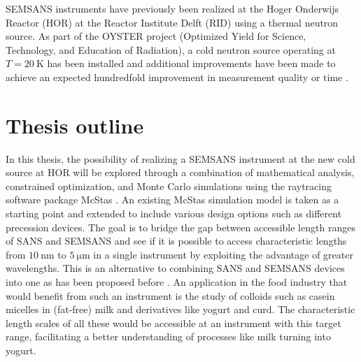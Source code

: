 SEMSANS instruments have previously been realized at the Hoger Onderwijs Reactor (HOR) at the Reactor Institute Delft (RID) using a thermal neutron source. As part of the OYSTER project (Optimized Yield for Science, Technology, and Education of Radiation), a cold neutron source operating at $T=\SI{20}{\kelvin}$ has been installed and additional improvements have been made to achieve an expected hundredfold improvement in measurement quality or time \cite{OYSTER2008}.

\section{Thesis outline}
\label{c1.3}
In this thesis, the possibility of realizing a SEMSANS instrument at the new cold source at HOR will be explored through a combination of mathematical analysis, constrained optimization, and Monte Carlo simulations using the raytracing software package McStas \cite{willendrup2020}. An existing McStas simulation model \cite{bouwman2021b} is taken as a starting point and extended to include various design options such as different precession devices. 
The goal is to bridge the gap between accessible length ranges of SANS and SEMSANS \cite{bouwman2021} and see if it is possible to access characteristic lengths from $\SI{10}{\nano\meter}$ to $\SI{5}{\micro\meter}$ in a single instrument by exploiting the advantage of greater wavelengths. This is an alternative to combining SANS and SEMSANS devices into one as has been proposed before \cite{bouwman2011}\cite{kusmin2017}. An application in the food industry that would benefit from such an instrument is the study of colloids such as casein micelles in (fat-free) milk and derivatives like yogurt and curd. The characteristic length scales of all these would be accessible at an instrument with this target range, facilitating a better understanding of processes like milk turning into yogurt. 